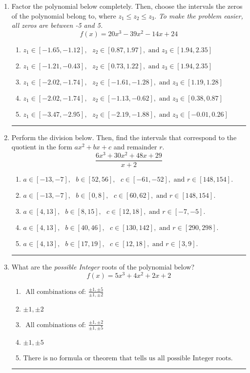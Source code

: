 \documentclass[14pt]{extbook}
\newcommand{\litem}[1]{\item#1\hspace*{-1cm}\rule{\textwidth}{0.4pt}}
\begin{document}
\begin{enumerate}
\litem{
Factor the polynomial below completely. Then, choose the intervals the zeros of the polynomial belong to, where $z_1 \leq z_2 \leq z_3$. \textit{To make the problem easier, all zeros are between -5 and 5.}\[ f(x) = 20x^{3} -39 x^{2} -14 x + 24 \]\begin{enumerate}[label=\Alph*.]
\item \( z_1 \in [-1.65, -1.12], \text{   }  z_2 \in [0.87, 1.97], \text{   and   } z_3 \in [1.94, 2.35] \)
\item \( z_1 \in [-1.21, -0.43], \text{   }  z_2 \in [0.73, 1.22], \text{   and   } z_3 \in [1.94, 2.35] \)
\item \( z_1 \in [-2.02, -1.74], \text{   }  z_2 \in [-1.61, -1.28], \text{   and   } z_3 \in [1.19, 1.28] \)
\item \( z_1 \in [-2.02, -1.74], \text{   }  z_2 \in [-1.13, -0.62], \text{   and   } z_3 \in [0.38, 0.87] \)
\item \( z_1 \in [-3.47, -2.95], \text{   }  z_2 \in [-2.19, -1.88], \text{   and   } z_3 \in [-0.01, 0.26] \)

\end{enumerate} }
\litem{
Perform the division below. Then, find the intervals that correspond to the quotient in the form $ax^2+bx+c$ and remainder $r$.\[ \frac{6x^{3} +30 x^{2} +48 x + 29}{x + 2} \]\begin{enumerate}[label=\Alph*.]
\item \( a \in [-13, -7], \text{   } b \in [52, 56], \text{   } c \in [-61, -52], \text{   and   } r \in [148, 154]. \)
\item \( a \in [-13, -7], \text{   } b \in [0, 8], \text{   } c \in [60, 62], \text{   and   } r \in [148, 154]. \)
\item \( a \in [4, 13], \text{   } b \in [8, 15], \text{   } c \in [12, 18], \text{   and   } r \in [-7, -5]. \)
\item \( a \in [4, 13], \text{   } b \in [40, 46], \text{   } c \in [130, 142], \text{   and   } r \in [290, 298]. \)
\item \( a \in [4, 13], \text{   } b \in [17, 19], \text{   } c \in [12, 18], \text{   and   } r \in [3, 9]. \)

\end{enumerate} }
\litem{
What are the \textit{possible Integer} roots of the polynomial below?\[ f(x) = 5x^{3} +4 x^{2} +2 x + 2 \]\begin{enumerate}[label=\Alph*.]
\item \( \text{ All combinations of: }\frac{\pm 1,\pm 5}{\pm 1,\pm 2} \)
\item \( \pm 1,\pm 2 \)
\item \( \text{ All combinations of: }\frac{\pm 1,\pm 2}{\pm 1,\pm 5} \)
\item \( \pm 1,\pm 5 \)
\item \( \text{There is no formula or theorem that tells us all possible Integer roots.} \)


\end{enumerate}}
\end{enumerate}
\end{document}
